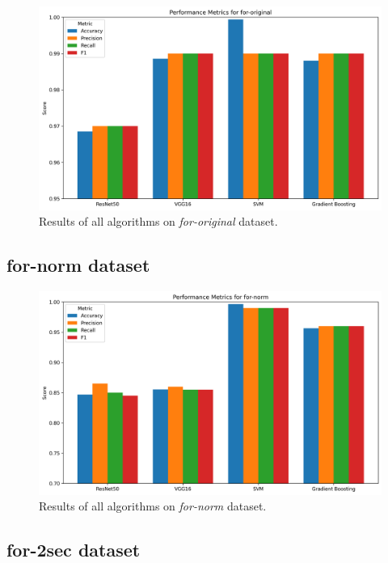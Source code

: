 \documentclass[conference]{IEEEtran}
\begin{document}
\begin{figure}
  \centering
  \includegraphics[width=\linewidth]{images/performance_metrics_for-original.csv.png}
  \caption{Results of all algorithms on \textit{for-original} dataset.}
  \label{fig:performance_metrics_for-original}
\end{figure}

\subsection{for-norm dataset}

\begin{figure}
  \centering
  \includegraphics[width=\linewidth]{images/performance_metrics_for-norm.csv.png}
  \caption{Results of all algorithms on \textit{for-norm} dataset.}
  \label{fig:performance_metrics_for-norm}
\end{figure}

\subsection{for-2sec dataset}
\end{document}

